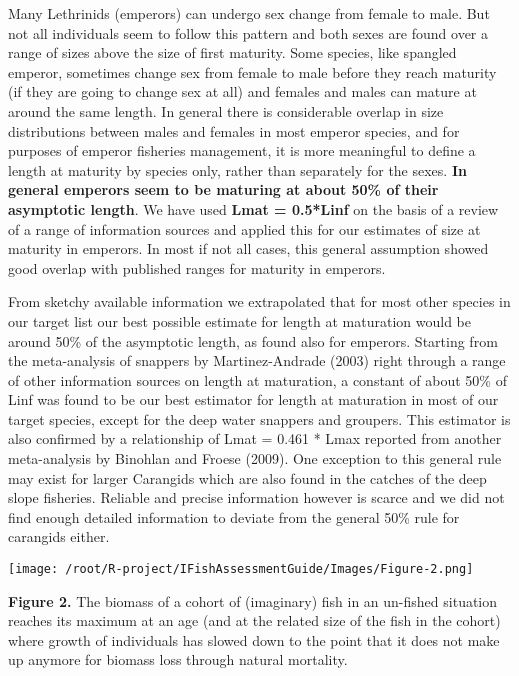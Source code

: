 Many Lethrinids (emperors) can undergo sex change from female to male. But not all individuals seem to follow this pattern and both sexes are found over a range of sizes above the size of first maturity. Some species, like spangled emperor, sometimes change sex from female to male before they reach maturity (if they are going to change sex at all) and females and males can mature at around the same length. In general there is considerable overlap in size distributions between males and females in most emperor species, and for purposes of emperor fisheries management, it is more meaningful to define a length at maturity by species only, rather than separately for the sexes. \textbf{In general emperors seem to be maturing at about 50\% of their asymptotic length}. We have used \textbf{Lmat = 0.5*Linf} on the basis of a review of a range of information sources and applied this for our estimates of size at maturity in emperors. In most if not all cases, this general assumption showed good overlap with published ranges for maturity in emperors.

From sketchy available information we extrapolated that for most other species in our target list our best possible estimate for length at maturation would be around 50\% of the asymptotic length, as found also for emperors. Starting from the meta-analysis of snappers by Martinez-Andrade (2003) right through a range of other information sources on length at maturation, a constant of about 50\% of Linf was found to be our best estimator for length at maturation in most of our target species, except for the deep water snappers and groupers. This estimator is also confirmed by a relationship of Lmat = 0.461 * Lmax reported from another meta-analysis by Binohlan and Froese (2009). One exception to this general rule may exist for larger Carangids which are also found in the catches of the deep slope fisheries. Reliable and precise information however is scarce and we did not find enough detailed information to deviate from the general 50\% rule for carangids either.

\begin{center}
\texttt{[image: /root/R-project/IFishAssessmentGuide/Images/Figure-2.png]}
\end{center}
\textbf{Figure 2.} The biomass of a cohort of (imaginary) fish in an un-fished situation reaches its maximum at an age (and at the related size of the fish in the cohort) where growth of individuals has slowed down to the point that it does not make up anymore for biomass loss through natural mortality.

